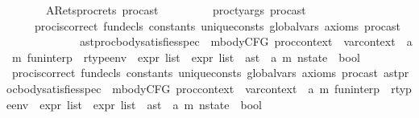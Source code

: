 \begin{isabellebody}
\ \ \ \ \ \ \ ARets{\isacharcolon}{\kern0pt}{\isachardoublequoteopen}proc{\isacharunderscore}{\kern0pt}rets\ proc{\isacharunderscore}{\kern0pt}ast\ {\isacharequal}{\kern0pt}\ {\isacharbrackleft}{\kern0pt}{\isacharbrackright}{\kern0pt}{\isachardoublequoteclose}\isanewline
\ \ \ \ \ \ \ {\isachardoublequoteopen}proc{\isacharunderscore}{\kern0pt}ty{\isacharunderscore}{\kern0pt}args\ proc{\isacharunderscore}{\kern0pt}ast\ {\isacharequal}{\kern0pt}\ {}{\isachardoublequoteclose}\ \ \ \isanewline
\ \ \ \ \ {\isachardoublequoteopen}proc{\isacharunderscore}{\kern0pt}is{\isacharunderscore}{\kern0pt}correct\ fun{\isacharunderscore}{\kern0pt}decls\ constants\ unique{\isacharunderscore}{\kern0pt}consts\ global{\isacharunderscore}{\kern0pt}vars\ axioms\ proc{\isacharunderscore}{\kern0pt}ast\ \isanewline
\ \ \ \ \ \ \ \ \ \ \ \ \ {\isacharparenleft}{\kern0pt}ast{\isacharunderscore}{\kern0pt}proc{\isacharunderscore}{\kern0pt}body{\isacharunderscore}{\kern0pt}satisfies{\isacharunderscore}{\kern0pt}spec\ {\isacharcolon}{\kern0pt}{\isacharcolon}{\kern0pt}\ mbodyCFG\ proc{\isacharunderscore}{\kern0pt}context\ {\isasymRightarrow}\ var{\isacharunderscore}{\kern0pt}context\ {\isasymRightarrow}\ {\isacharparenleft}{\kern0pt}{\isacharprime}{\kern0pt}a{\isacharcomma}{\kern0pt}\ {\isacharprime}{\kern0pt}m{\isacharparenright}{\kern0pt}\ fun{\isacharunderscore}{\kern0pt}interp\ {\isasymRightarrow}\ rtype{\isacharunderscore}{\kern0pt}env\ {\isasymRightarrow}\ expr\ list\ {\isasymRightarrow}\ expr\ list\ {\isasymRightarrow}\ ast\ {\isasymRightarrow}\ {\isacharparenleft}{\kern0pt}{\isacharprime}{\kern0pt}a{\isacharcomma}{\kern0pt}\ {\isacharprime}{\kern0pt}m{\isacharparenright}{\kern0pt}\ nstate\ {\isasymRightarrow}\ bool{\isacharparenright}{\kern0pt}{\isachardoublequoteclose}\isanewline
%
\isadelimproof
%
\endisadelimproof
%
\isatagproof
{}\isamarkupfalse%
\ {\isacharminus}{\kern0pt}\isanewline
\ \ \isamarkupfalse%
\ {\isachardoublequoteopen}proc{\isacharunderscore}{\kern0pt}is{\isacharunderscore}{\kern0pt}correct\ fun{\isacharunderscore}{\kern0pt}decls\ constants\ unique{\isacharunderscore}{\kern0pt}consts\ global{\isacharunderscore}{\kern0pt}vars\ axioms\ proc{\isacharunderscore}{\kern0pt}ast\ {\isacharparenleft}{\kern0pt}ast{\isacharunderscore}{\kern0pt}proc{\isacharunderscore}{\kern0pt}body{\isacharunderscore}{\kern0pt}satisfies{\isacharunderscore}{\kern0pt}spec\ {\isacharcolon}{\kern0pt}{\isacharcolon}{\kern0pt}\ mbodyCFG\ proc{\isacharunderscore}{\kern0pt}context\ {\isasymRightarrow}\ var{\isacharunderscore}{\kern0pt}context\ {\isasymRightarrow}\ {\isacharparenleft}{\kern0pt}{\isacharprime}{\kern0pt}a{\isacharcomma}{\kern0pt}\ {\isacharprime}{\kern0pt}m{\isacharparenright}{\kern0pt}\ fun{\isacharunderscore}{\kern0pt}interp\ {\isasymRightarrow}\ rtype{\isacharunderscore}{\kern0pt}env\ {\isasymRightarrow}\ expr\ list\ {\isasymRightarrow}\ expr\ list\ {\isasymRightarrow}\ ast\ {\isasymRightarrow}\ {\isacharparenleft}{\kern0pt}{\isacharprime}{\kern0pt}a{\isacharcomma}{\kern0pt}\ {\isacharprime}{\kern0pt}m{\isacharparenright}{\kern0pt}\ nstate\ {\isasymRightarrow}\ bool{\isacharparenright}{\kern0pt}{\isachardoublequoteclose}\isanewline

\end{isabellebody}
